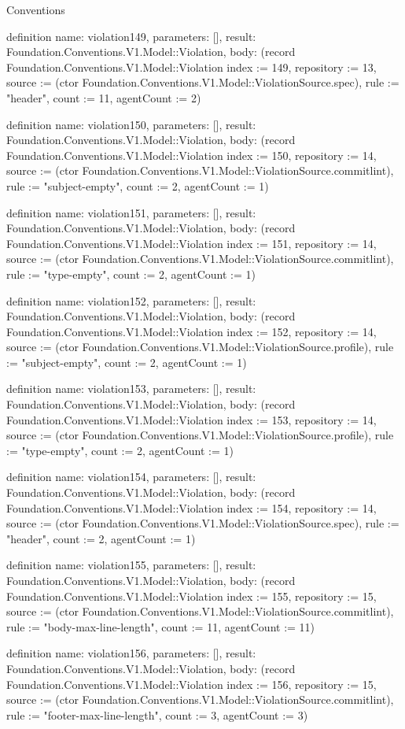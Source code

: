 \begin{lexlean}{Conventions}
\begin{semanticmodule}
definition{
  name: violation149,
  parameters: [],
  result: Foundation.Conventions.V1.Model::Violation,
  body: (record Foundation.Conventions.V1.Model::Violation {index := 149, repository := 13, source := (ctor Foundation.Conventions.V1.Model::ViolationSource.spec), rule := "header", count := 11, agentCount := 2})
}

definition{
  name: violation150,
  parameters: [],
  result: Foundation.Conventions.V1.Model::Violation,
  body: (record Foundation.Conventions.V1.Model::Violation {index := 150, repository := 14, source := (ctor Foundation.Conventions.V1.Model::ViolationSource.commitlint), rule := "subject-empty", count := 2, agentCount := 1})
}

definition{
  name: violation151,
  parameters: [],
  result: Foundation.Conventions.V1.Model::Violation,
  body: (record Foundation.Conventions.V1.Model::Violation {index := 151, repository := 14, source := (ctor Foundation.Conventions.V1.Model::ViolationSource.commitlint), rule := "type-empty", count := 2, agentCount := 1})
}

definition{
  name: violation152,
  parameters: [],
  result: Foundation.Conventions.V1.Model::Violation,
  body: (record Foundation.Conventions.V1.Model::Violation {index := 152, repository := 14, source := (ctor Foundation.Conventions.V1.Model::ViolationSource.profile), rule := "subject-empty", count := 2, agentCount := 1})
}

definition{
  name: violation153,
  parameters: [],
  result: Foundation.Conventions.V1.Model::Violation,
  body: (record Foundation.Conventions.V1.Model::Violation {index := 153, repository := 14, source := (ctor Foundation.Conventions.V1.Model::ViolationSource.profile), rule := "type-empty", count := 2, agentCount := 1})
}

definition{
  name: violation154,
  parameters: [],
  result: Foundation.Conventions.V1.Model::Violation,
  body: (record Foundation.Conventions.V1.Model::Violation {index := 154, repository := 14, source := (ctor Foundation.Conventions.V1.Model::ViolationSource.spec), rule := "header", count := 2, agentCount := 1})
}

definition{
  name: violation155,
  parameters: [],
  result: Foundation.Conventions.V1.Model::Violation,
  body: (record Foundation.Conventions.V1.Model::Violation {index := 155, repository := 15, source := (ctor Foundation.Conventions.V1.Model::ViolationSource.commitlint), rule := "body-max-line-length", count := 11, agentCount := 11})
}

definition{
  name: violation156,
  parameters: [],
  result: Foundation.Conventions.V1.Model::Violation,
  body: (record Foundation.Conventions.V1.Model::Violation {index := 156, repository := 15, source := (ctor Foundation.Conventions.V1.Model::ViolationSource.commitlint), rule := "footer-max-line-length", count := 3, agentCount := 3})
}


\end{semanticmodule}
\end{lexlean}
